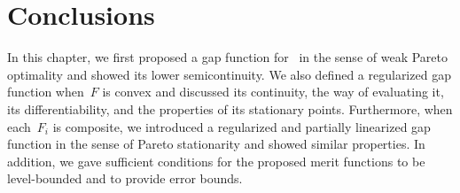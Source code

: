 \documentclass[../main]{subfiles}
\begin{document}
\section{Conclusions} 
In this chapter, we first proposed a gap function for~ in the sense of weak Pareto optimality and showed its lower semicontinuity.
We also defined a regularized gap function when~$F$ is convex and discussed its continuity, the way of evaluating it, its differentiability, and the properties of its stationary points.
Furthermore, when each~$F_i$ is composite, we introduced a regularized and partially linearized gap function in the sense of Pareto stationarity and showed similar properties.
In addition, we gave sufficient conditions for the proposed merit functions to be level-bounded and to provide error bounds.
\end{document}
